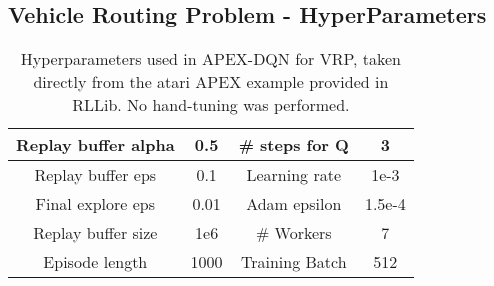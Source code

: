 \begin{appendices}
\section{Vehicle Routing Problem - HyperParameters}
\label{appendix:vrp_hp}
\begin{table}[h!]
	\centering
	\begin{tabular}{ |c|c|c|c| } 
		\hline
		Replay buffer alpha & 0.5 & \# steps for Q & 3 \\ 
		\hline
		Replay buffer eps & 0.1 & Learning rate & 1e-3 \\
		\hline	
		Final explore eps & 0.01 & Adam epsilon & 1.5e-4 \\
		\hline
		Replay buffer size & 1e6 & \# Workers & 7 \\
		\hline
		Episode length & 1000 &  Training Batch & 512 \\
		\hline
	\end{tabular}
	\caption{Hyperparameters used in APEX-DQN for VRP, taken directly from the atari APEX example provided in RLLib. No hand-tuning was performed.}
	\label{table:vrp_hyperparam}
	\vspace{-1em}
\end{table}
\clearpage


\end{appendices}